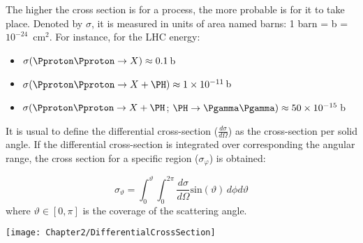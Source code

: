 The higher the cross section is for a process, the more probable is for it to take place. %
Denoted by $\sigma$, it is measured in units of area named barns: 1 barn = b = $10^{-24}\,$$\textrm{ cm}^2$. For instance, for the LHC energy:
\begin{itemize}
	\item $\sigma(\Pproton\Pproton \rightarrow X) \approx 0.1\,$b
	\item $\sigma(\Pproton\Pproton \rightarrow X + \PH) \approx 1 \times 10^{-11}\,$b
	\item $\sigma(\Pproton\Pproton \rightarrow X + \PH$; $\PH \rightarrow \Pgamma \Pgamma) \approx 50 \times 10^{-15}\,$b
\end{itemize}



It is usual to define the differential cross-section ($\frac{d\sigma}{d\Omega}$) as the cross-section per solid angle. 
If the differential cross-section is integrated over corresponding the angular range, the cross section 
for a specific region ($\sigma_{\varphi}$) is obtained:

\begin{minipage}{0.45\textwidth}
\begin{equation*}
	\sigma_{\vartheta} = \int_{0}^{\vartheta} \int_{0}^{2\pi} \frac{d\sigma}{d\Omega} \textrm{sin}(\vartheta)\, d\phi d\vartheta
\end{equation*}
where $\vartheta \in [0, \pi]$ is the coverage of the scattering angle. 
\end{minipage} \hfill
\begin{minipage}{0.45\textwidth}
 	  \texttt{[image: Chapter2/DifferentialCrossSection]}
\end{minipage} 


